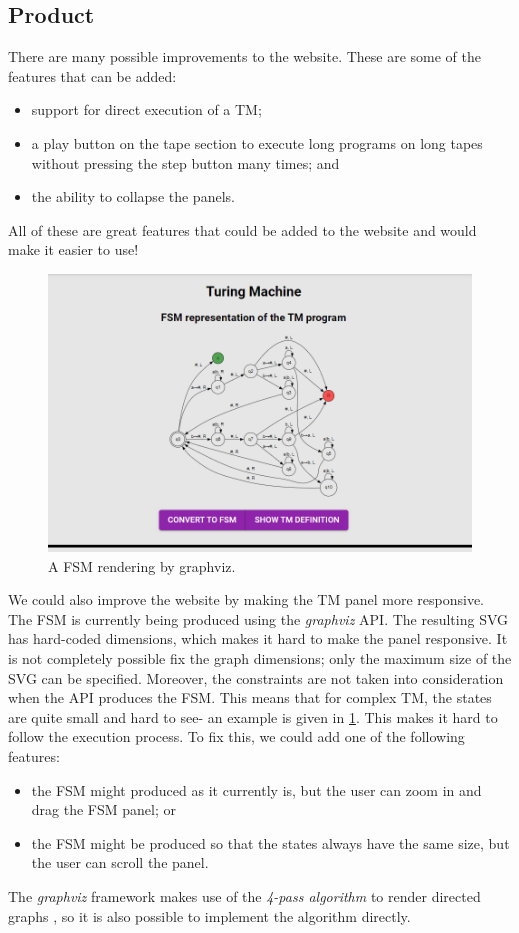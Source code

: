  \subsection{Product}
There are many possible improvements to the website. These are some of the features that can be added:
\begin{itemize}
    \item support for direct execution of a TM;
    \item a play button on the tape section to execute long programs on long tapes without pressing the step button many times; and
    \item the ability to collapse the panels.
\end{itemize}
All of these are great features that could be added to the website and would make it easier to use!

\begin{figure}[htb]
    \centering
    \includegraphics[scale=0.3]{images/Bad FSM visualisation.png}
    \caption{A FSM rendering by graphviz.}
    \label{fig:bad_graphviz_fsm}
\end{figure}

We could also improve the website by making the TM panel more responsive. The FSM is currently being produced using the \textit{graphviz} API. The resulting SVG has hard-coded dimensions, which makes it hard to make the panel responsive. It is not completely possible fix the graph dimensions; only the maximum size of the SVG can be specified. Moreover, the constraints are not taken into consideration when the API produces the FSM. This means that for complex TM, the states are quite small and hard to see- an example is given in \ref{fig:bad_graphviz_fsm}. This makes it hard to follow the execution process. To fix this, we could add one of the following features:
\begin{itemize}
    \item the FSM might produced as it currently is, but the user can zoom in and drag the FSM panel; or
    \item the FSM might be produced so that the states always have the same size, but the user can scroll the panel. 
\end{itemize}
The \textit{graphviz} framework makes use of the \emph{4-pass algorithm} to render directed graphs \citep{gansner1993technique, gansner2006drawing}, so it is also possible to implement the algorithm directly.

